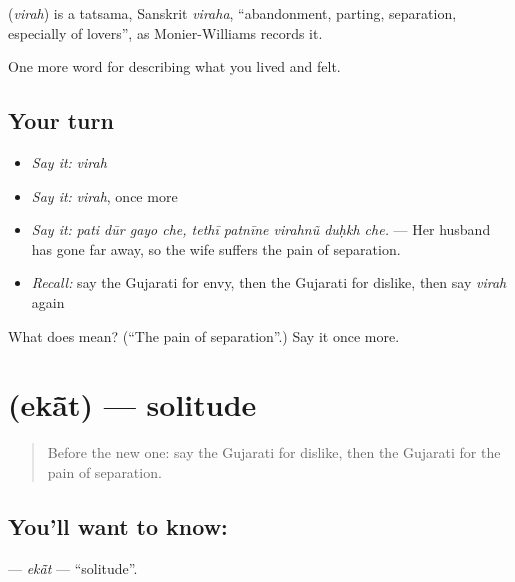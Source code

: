 \begin{cousinweb}
\textbf{} (\emph{virah}) is a tatsama, Sanskrit \emph{viraha}, \textquotedblleft{}abandonment, parting, separation, especially of lovers\textquotedblright{}, as Monier-Williams records it.
\end{cousinweb}

\begin{grammarlens}[title={What you've built}]
One more word for describing what you lived and felt.
\end{grammarlens}

\subsection*{Your turn}
\begin{itemize}
\raggedright
  \item \emph{Say it:} \emph{virah}
  \item \emph{Say it:} \emph{virah}, once more
  \item \emph{Say it:} \emph{pati dūr gayo che, tethī patnīne virahnũ duḥkh che.} — Her husband has gone far away, so the wife suffers the pain of separation.
  \item \emph{Recall:} say the Gujarati for envy, then the Gujarati for dislike, then say \emph{virah} again
\end{itemize}

\begin{tcolorbox}[breakable,colback=teal!4,colframe=teal!35!black,title={Before you move on}]
What does  mean? (\textquotedblleft{}The pain of separation\textquotedblright{}.) Say it once more.
\end{tcolorbox}
\section[\texorpdfstring{\gu{એકાંત} (ekā̃t)}{એકાંત (ekā̃t)}]{ (ekā̃t) — solitude}

\label{lesson:GU-C458-ekat}



\begin{quote}
Before the new one: say the Gujarati for dislike, then the Gujarati for the pain of separation.
\end{quote}

\subsection*{You'll want to know: }
\textbf{} — \emph{ekā̃t} — \textquotedblleft{}solitude\textquotedblright{}.

